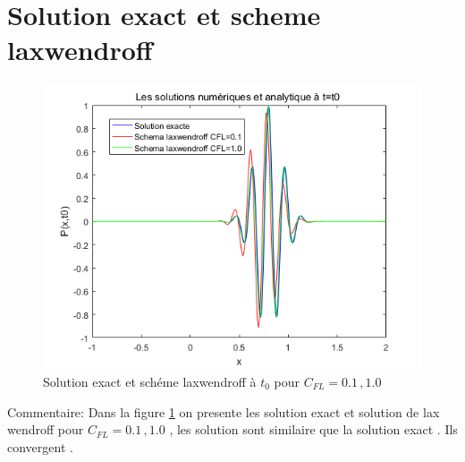 \documentclass[a4paper,10pt]{report} %
\begin{document}
\section{Solution exact et scheme laxwendroff }
\begin{figure}[h]
\begin{center}
\includegraphics[width=1.0\textwidth]{FIG/figure3.png}
\end{center}
\caption{Solution exact et schéme laxwendroff à $t_0$ pour $C_{FL}=0.1\,,1.0$}
\label{figure3}
\end{figure}
Commentaire:
Dans la figure \ref{figure3} on presente les solution exact et solution de lax wendroff pour 
$C_{FL}=0.1\,,1.0$ , les solution sont similaire que la solution exact . Ils convergent .
\end{document}
